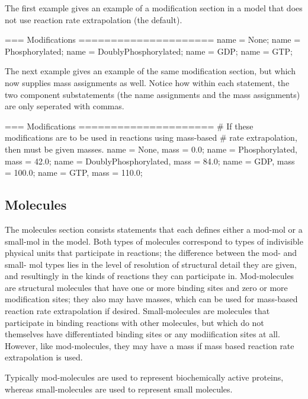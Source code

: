 The first example gives an example of a modification section in a
model that does not use reaction rate extrapolation (the default).

\begin{ExampleMZR}
=== Modifications =====================
     name = None;
     name = Phosphorylated;
     name = DoublyPhosphorylated;
     name = GDP;
     name = GTP;
\end{ExampleMZR}

The next example gives an example of the same modification section,
but which now supplies mass assignments as well.  Notice how within
each statement, the two component substatements (the name assignments
and the mass assignments) are only seperated with commas.

\begin{ExampleMZR}
=== Modifications =====================
     # If these modifications are to be used in reactions using mass-based
     # rate extrapolation, then must be given masses.
     name = None, mass = 0.0;
     name = Phosphorylated, mass = 42.0;
     name = DoublyPhosphorylated, mass = 84.0;
     name = GDP, mass = 100.0;
     name = GTP, mass = 110.0;
\end{ExampleMZR}


\subsection{Molecules}
The molecules section consists statements that each defines either a
mod-mol or a small-mol in the model.  Both types of molecules correspond to
types of indivisible physical units that participate in reactions; the
difference between the mod- and small- mol types lies in the level of
resolution of structural detail they are given, and resultingly in the
kinds of reactions they can participate in. Mod-molecules are structural
molecules that have one or more binding sites and zero or more
modification sites; they also may have masses, which can be used for
mass-based reaction rate extrapolation if desired.  Small-molecules are
molecules that participate in binding reactions with other molecules, but which
do not themselves have differentiated binding sites or any
modiification sites at all. However, like mod-molecules, they may have
a mass if mass based reaction rate extrapolation is used.

Typically mod-molecules are used to represent biochemically active
proteins, whereas small-molecules are used to represent small molecules.  

